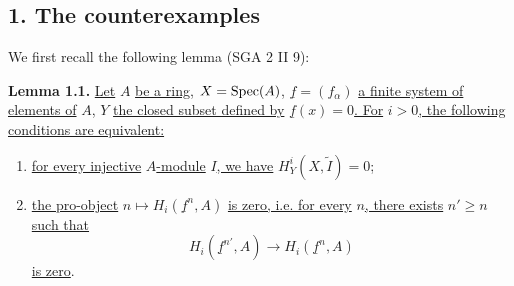 \subsection*{1. The counterexamples}
We first recall the following lemma (SGA 2 II 9):

\textbf{Lemma 1.1.} \uline{Let} $A$ \uline{be a ring,} $X=\operatorname{Spec}(A)$, $\underline{f}=(f_\alpha)$ \uline{a finite system of elements of} $A$, $Y$ \uline{the closed subset defined by} $\underline{f}(x)=0$\uline{. For} $i>0$\uline{, the following conditions are equivalent:}
\begin{enumerate}[label=(\roman*)]
\item \uline{for every injective} $A$\uline{-module} $I$\uline{, we have} $H^i_Y(X,\widetilde I)=0$;
\item \uline{the pro-object} $n\mapsto H_i(\underline{f}^n,A)$ \uline{is zero, i.e. for every} $n$\uline{, there exists} $n'\geq n$
%
\uline{such that}
\[
 H_i(\underline{f}^{n'},A)\longrightarrow H_i(\underline{f}^n,A)
\]
\uline{is zero}.
\end{enumerate}

